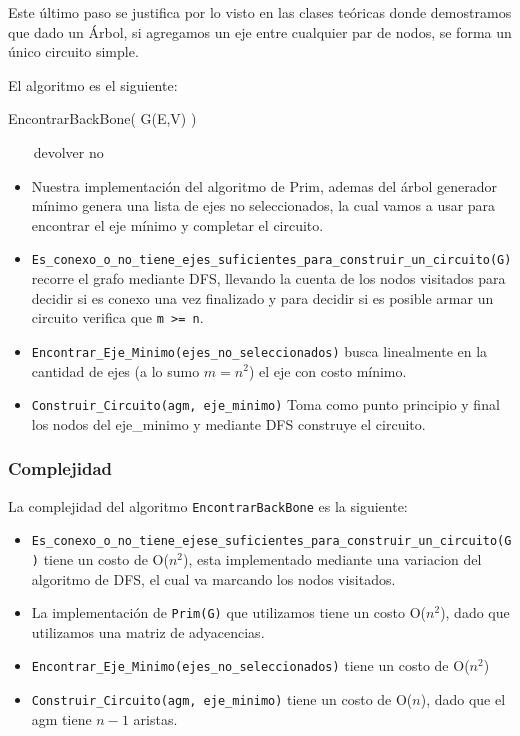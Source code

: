 Este último paso se justifica por lo visto en las clases teóricas donde demostramos que dado un Árbol, si agregamos un eje entre cualquier par de nodos, se forma un único circuito simple.

El algoritmo es el siguiente:

\begin{algorithm}
\begin{algorithmic}[1]\parskip=1mm
\caption{EncontrarBackBone( G(E,V) ) }
	\STATE ~~~{ devolver no}
 \end{algorithmic}
\end{algorithm}

\begin{itemize}
	\item Nuestra implementación del algoritmo de Prim, ademas del árbol generador mínimo genera una lista de ejes no seleccionados, la cual vamos a usar para encontrar el eje mínimo y completar el circuito.
	\item \verb+Es_conexo_o_no_tiene_ejes_suficientes_para_construir_un_circuito(G)+ recorre el grafo mediante DFS, llevando la cuenta de los nodos visitados para decidir si es conexo una vez finalizado y para decidir si es posible armar un circuito verifica que \verb+m >= n+.
	\item \verb+Encontrar_Eje_Minimo(ejes_no_seleccionados)+ busca linealmente en la cantidad de ejes (a lo sumo $m = n^2$) el eje con costo mínimo.
	\item \verb+Construir_Circuito(agm, eje_minimo)+ Toma como punto principio y final los nodos del eje_minimo y mediante DFS construye el circuito.
\end{itemize}

\subsubsection{Complejidad}

La complejidad del algoritmo \verb+EncontrarBackBone+  es la siguiente: 

\begin{itemize}
	\item \verb+Es_conexo_o_no_tiene_ejese_suficientes_para_construir_un_circuito(G)+ tiene un costo de O($n^2$), esta implementado mediante una variacion del algoritmo de DFS, el cual va marcando los nodos visitados.
	\item La implementación de \verb+Prim(G)+ que utilizamos tiene un costo O($n^2$), dado que utilizamos una matriz de adyacencias.
	\item \verb+Encontrar_Eje_Minimo(ejes_no_seleccionados)+ tiene un costo de O($n^2$)
	\item \verb+Construir_Circuito(agm, eje_minimo)+ tiene un costo de O($n$), dado que el agm tiene $n-1$ aristas.
\end{itemize}

